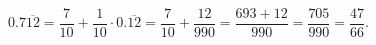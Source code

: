 $0.7\overline{12}=\dfrac7{10}+\dfrac1{10}\cdot0.\overline{12}=\dfrac7{10}+\dfrac{12}{990}=\dfrac{693+12}{990}=\dfrac{705}{990}=\boxed{\dfrac{47}{66}}$.
